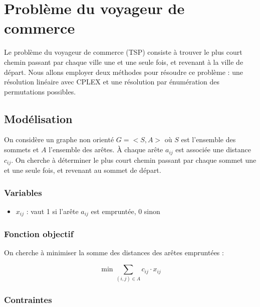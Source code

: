 \chapter{Problème du voyageur de commerce}
\label{chap:tsp}

Le problème du voyageur de commerce (TSP) consiste à trouver le plus court chemin passant par chaque ville une et une seule fois, et revenant à la ville de départ. Nous allons employer deux méthodes pour résoudre ce problème : une résolution linéaire avec CPLEX \cite{wiki_tsp} et une résolution par énumération des permutations possibles.

\section{Modélisation}
\label{sec:tsp_model}
On considère un graphe non orienté $G=<S,A>$ où $S$ est l'ensemble des sommets et $A$ l'ensemble des arêtes. À chaque arête $a_{ij}$ est associée une distance $c_{ij}$. On cherche à déterminer le plus court chemin passant par chaque sommet une et une seule fois, et revenant au sommet de départ.

\subsection*{Variables}

\begin{itemize}
    \item $x_{ij}$ : vaut 1 si l'arête $a_{ij}$ est empruntée, 0 sinon
\end{itemize}

\subsection*{Fonction objectif}

On cherche à minimiser la somme des distances des arêtes empruntées :

\begin{equation}
    \min \sum_{(i,j) \in A} c_{ij} \cdot x_{ij}
\end{equation}

\subsection*{Contraintes}

